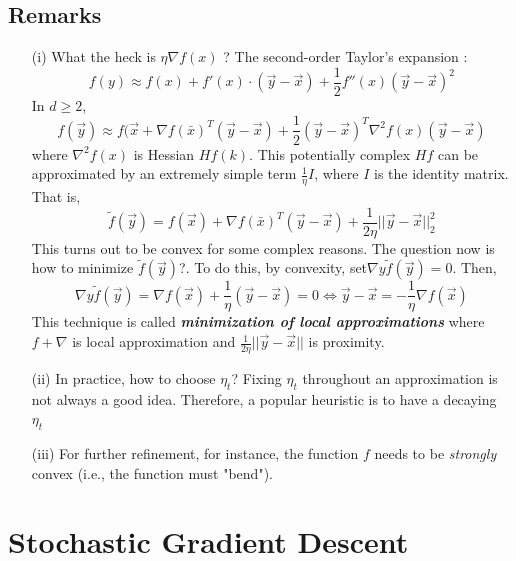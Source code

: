 \documentclass[12pt]{article}
\begin{document}
\subsection{Remarks}
\begin{itemize}
	\item[(i)] What the heck is $ \eta \nabla f(x)$ ?
	The second-order Taylor's expansion :
	$$
	f(y) \approx f(x) + f'(x)\cdot (\vec{y}-\vec{x}) + \frac{1}{2} f''(x)(\vec{y}-\vec{x})^2 
	$$  
	In $ d \geq 2$,
	$$
	f(\vec{y}) \approx f(\vec{x} + \nabla f(\bar{x})^T(\vec{y}-\vec{x}) +\frac{1}{2}(\vec{y}-\vec{x})^T \nabla^2f(x)(\vec{y}-\vec{x}) 
	$$
	where $\nabla^2f(x)$ is Hessian $Hf(k)$. This potentially complex $Hf$ can be approximated by an extremely simple term $\frac{1}{\eta}I$, where $I$ is the identity matrix. That is,
	$$
	\tilde{f}(\vec{y}) = f(\vec{x}) + \nabla f(\bar{x})^T(\vec{y}-\vec{x}) +\frac{1}{2\eta}||\vec{y}-\vec{x}||_2^2
	$$ 
	This turns out to be convex for some complex reasons. The question now is how to minimize $\tilde{f}(\vec{y}) $?. To do this, by convexity, set$ \nabla{y} \tilde{f}(\vec{y})  =0$. Then,
	$$
	\nabla{y} \tilde{f}(\vec{y})  =  \nabla f(\vec{x}) + \frac{1}{\eta}(\vec{y}-\vec{x}) =0 \Longleftrightarrow \vec{y} -\vec{x} = -\frac{1}{\eta} \nabla f(\vec{x}) 
	$$ 
	This technique is called \textit{\textbf{minimization of local approximations}} where $f +\nabla$ is local approximation and $\frac{1}{2\eta}||\vec{y}-\vec{x}||$ is proximity. 
	\item[(ii)] In practice,  how to  choose $\eta_t$? Fixing $\eta_t$ throughout an approximation is not always a good idea. Therefore, a popular heuristic is to have a decaying $\eta_t$
	\item[(iii)] For further refinement, for instance,  the function $f$ needs to be \textit{strongly} convex (i.e.,  the function must "bend"). 
\end{itemize}

\section{Stochastic Gradient Descent}
\end{document}
